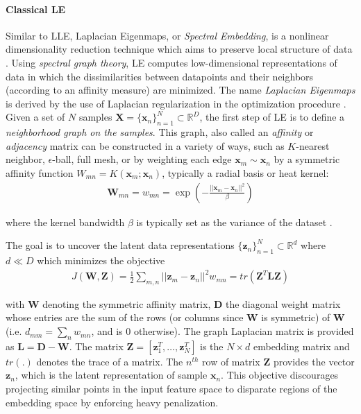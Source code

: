 \paragraph{Classical LE}
Similar to LLE, Laplacian Eigenmaps, or \textit{Spectral Embedding}, is a nonlinear dimensionality reduction technique which aims to preserve local structure of data \citep{Belkin2003LaplacianEigenmaps, Raducanu2012SupervisedNonlinearDimReduction,VanDerMaaten2009DRReview}.  Using \textit{spectral graph theory}, LE computes low-dimensional representations of data in which the dissimilarities between datapoints and their neighbors (according to an affinity measure) are minimized.  The name \textit{Laplacian Eigenmaps} is derived by the use of Laplacian regularization in the optimization procedure \citep{Thorstensen2009ManifoldThesis}. Given a set of $N$ samples $\bm{X} = \{\bm{x}_n\}^{N}_{n=1} \subset \mathbb{R}^{D}$, the first step of LE is to define a \textit{neighborhood graph on the samples}.  This graph, also called an \textit{affinity} or \textit{adjacency} matrix can be constructed in a variety of ways, such as $K$-nearest neighbor, $\epsilon$-ball, full mesh, or by weighting each edge $\bm{x}_m \sim \bm{x}_n$ by a symmetric affinity function $W_{mn} = K(\bm{x}_m;\bm{x}_n)$, typically a radial basis or heat kernel:
\begin{align}
	\bm{W}_{mn}= w_{mn} = \exp \left ( - \frac{|| \bm{x}_m - \bm{x}_n ||^{2}}{\beta}  \right )
\end{align}

\noindent
where the kernel bandwidth $\beta$ is typically set as the variance of the dataset \citep{Raducanu2012SupervisedNonlinearDimReduction,Thorstensen2009ManifoldThesis}.

The goal is to uncover the latent data representations $\{ \bm{z}_n \}^{N}_{n=1} \subset \mathbb{R}^{d}$ where $d \ll D$ which minimizes the objective 
\begin{align}
	J(\bm{W},\bm{Z}) = \frac{1}{2} \sum_{m,n}^{}||\bm{z}_{m} - \bm{z}_{n} ||^{2}w_{mn} = tr(\bm{Z}^{T}\bm{L}\bm{Z})
\end{align}

\noindent
with $\bm{W}$ denoting the symmetric affinity matrix, $\bm{D}$ the diagonal weight matrix whose entries are the sum of the rows (or columns since $\bm{W}$ is symmetric) of $\bm{W}$ (i.e. $d_{mm} = \sum_{n}w_{mn}$, and is $0$ otherwise).  The graph Laplacian matrix is provided as $\bm{L} = \bm{D} - \bm{W}$.  The matrix $\bm{Z} = [\bm{z}^{T}_{1}, \dots, \bm{z}^{T}_{N}]$ is the $N \times d$ embedding matrix and $tr(.)$ denotes the trace of a matrix. The $n^{th}$ row of matrix $\bm{Z}$ provides the vector $\bm{z}_n$, which is the latent representation of sample  $\bm{x}_n$. This objective discourages projecting similar points in the input feature space to disparate regions of the embedding space by enforcing heavy penalization. 

